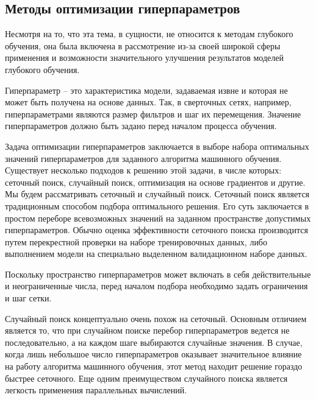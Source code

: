 \subsection{Методы оптимизации гиперпараметров}
Несмотря на то, что эта тема, в сущности, не относится к методам глубокого обучения, она была включена в рассмотрение из-за своей широкой сферы применения и возможности значительного улучшения результатов моделей глубокого обучения.

Гиперпараметр -- это характеристика модели, задаваемая извне и которая не может быть получена на основе данных. Так, в сверточных сетях, например, гиперпараметрами являются размер фильтров и шаг их перемещения. Значение гиперпараметров должно быть задано перед началом процесса обучения.

Задача оптимизации гиперпараметров\cite{hyperparamopt-overview} заключается в выборе набора оптимальных значений гиперпараметров для заданного алгоритма машинного обучения. Существует несколько подходов к решению этой задачи, в числе которых: сеточный поиск, случайный поиск, оптимизация на основе градиентов и другие.
Мы будем рассматривать сеточный и случайный поиск. Сеточный поиск является традиционным способом подбора оптимального решения. Его суть заключается в простом переборе всевозможных значений на заданном пространстве допустимых гиперпараметров. Обычно оценка эффективности сеточного поиска производится путем перекрестной проверки на наборе тренировочных данных, либо выполнением модели на специально выделенном валидационном наборе данных.

Поскольку пространство гиперпараметров может включать в себя действительные и неограниченные числа, перед началом подбора необходимо задать ограничения и шаг сетки.

Случайный поиск концептуально очень похож на сеточный. Основным отличием является то, что при случайном поиске перебор гиперпараметров ведется не последовательно, а на каждом шаге выбираются случайные значения\cite{hyperparamopt-random}. В случае, когда лишь небольшое число гиперпараметров оказывает значительное влияние на работу алгоритма машинного обучения, этот метод находит решение гораздо быстрее сеточного. Еще одним преимуществом случайного поиска является легкость применения параллельных вычислений.
